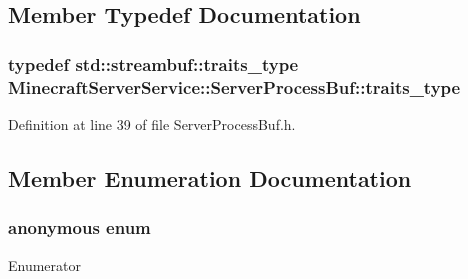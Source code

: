 \subsection{Member Typedef Documentation}
\subsubsection[{\texorpdfstring{traits\+\_\+type}{traits_type}}]{\setlength{\rightskip}{0pt plus 5cm}typedef std\+::streambuf\+::traits\+\_\+type {\bf Minecraft\+Server\+Service\+::\+Server\+Process\+Buf\+::traits\+\_\+type}}\hypertarget{class_minecraft_server_service_1_1_server_process_buf_a9c3a4b61a15b7051a7d8c84aae90ae6f}{}\label{class_minecraft_server_service_1_1_server_process_buf_a9c3a4b61a15b7051a7d8c84aae90ae6f}


Definition at line 39 of file Server\+Process\+Buf.\+h.



\subsection{Member Enumeration Documentation}
\subsubsection[{\texorpdfstring{anonymous enum}{anonymous enum}}]{\setlength{\rightskip}{0pt plus 5cm}anonymous enum\hspace{0.3cm}{\ttfamily [private]}}\hypertarget{class_minecraft_server_service_1_1_server_process_buf_a087f8bf390860bf7d926a92c809e7c50}{}\label{class_minecraft_server_service_1_1_server_process_buf_a087f8bf390860bf7d926a92c809e7c50}
\begin{Desc}
\item[Enumerator]\par
\begin{description}
\item[{\em 
bufsize\hypertarget{class_minecraft_server_service_1_1_server_process_buf_a087f8bf390860bf7d926a92c809e7c50a11482eda7e1eb693c1ed0f5548a8a2b0}{}\label{class_minecraft_server_service_1_1_server_process_buf_a087f8bf390860bf7d926a92c809e7c50a11482eda7e1eb693c1ed0f5548a8a2b0}
}]\end{description}
\end{Desc}


